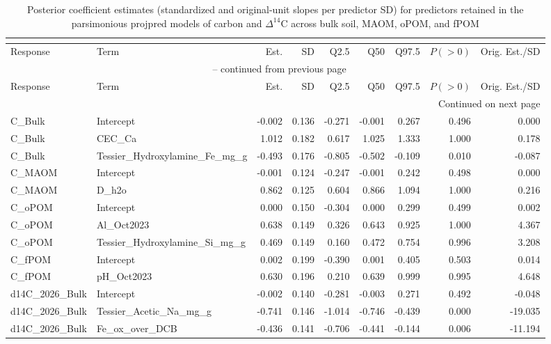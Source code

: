 \documentclass[preprint,12pt]{elsarticle}
\begin{document}
\begin{landscape}
\newpage

\begin{longtable}{llrrrrrrr}
\caption{Posterior coefficient estimates (standardized and original-unit slopes per predictor SD) for predictors retained in the parsimonious projpred models of carbon and $\Delta^{14}\text{C}$ across bulk soil, MAOM, oPOM, and fPOM}\\
\label{tab:coeffs_cd14c}\\
\toprule
Response & Term & Est. & SD & Q2.5 & Q50 & Q97.5 & $P(>0)$ & Orig. Est./SD \\
\midrule
\endfirsthead
\multicolumn{9}{c}{{\tablename\ \thetable{} -- continued from previous page}} \\
\toprule
Response & Term & Est. & SD & Q2.5 & Q50 & Q97.5 & $P(>0)$ & Orig. Est./SD \\
\midrule
\endhead
\midrule \multicolumn{9}{r}{{Continued on next page}} \\ \endfoot
\bottomrule \endlastfoot
C\_Bulk & Intercept & -0.002 & 0.136 & -0.271 & -0.001 & 0.267 & 0.496 & 0.000 \\
C\_Bulk & CEC\_Ca & 1.012 & 0.182 & 0.617 & 1.025 & 1.333 & 1.000 & 0.178 \\
C\_Bulk & Tessier\_Hydroxylamine\_Fe\_mg\_g & -0.493 & 0.176 & -0.805 & -0.502 & -0.109 & 0.010 & -0.087 \\
C\_MAOM & Intercept & -0.001 & 0.124 & -0.247 & -0.001 & 0.242 & 0.498 & 0.000 \\
C\_MAOM & D\_h2o & 0.862 & 0.125 & 0.604 & 0.866 & 1.094 & 1.000 & 0.216 \\
C\_oPOM & Intercept & 0.000 & 0.150 & -0.304 & 0.000 & 0.299 & 0.499 & 0.002 \\
C\_oPOM & Al\_Oct2023 & 0.638 & 0.149 & 0.326 & 0.643 & 0.925 & 1.000 & 4.367 \\
C\_oPOM & Tessier\_Hydroxylamine\_Si\_mg\_g & 0.469 & 0.149 & 0.160 & 0.472 & 0.754 & 0.996 & 3.208 \\
C\_fPOM & Intercept & 0.002 & 0.199 & -0.390 & 0.001 & 0.405 & 0.503 & 0.014 \\
C\_fPOM & pH\_Oct2023 & 0.630 & 0.196 & 0.210 & 0.639 & 0.999 & 0.995 & 4.648 \\
d14C\_2026\_Bulk & Intercept & -0.002 & 0.140 & -0.281 & -0.003 & 0.271 & 0.492 & -0.048 \\
d14C\_2026\_Bulk & Tessier\_Acetic\_Na\_mg\_g & -0.741 & 0.146 & -1.014 & -0.746 & -0.439 & 0.000 & -19.035 \\
d14C\_2026\_Bulk & Fe\_ox\_over\_DCB & -0.436 & 0.141 & -0.706 & -0.441 & -0.144 & 0.006 & -11.194 \\

\end{longtable}
\end{landscape}
\end{document}
